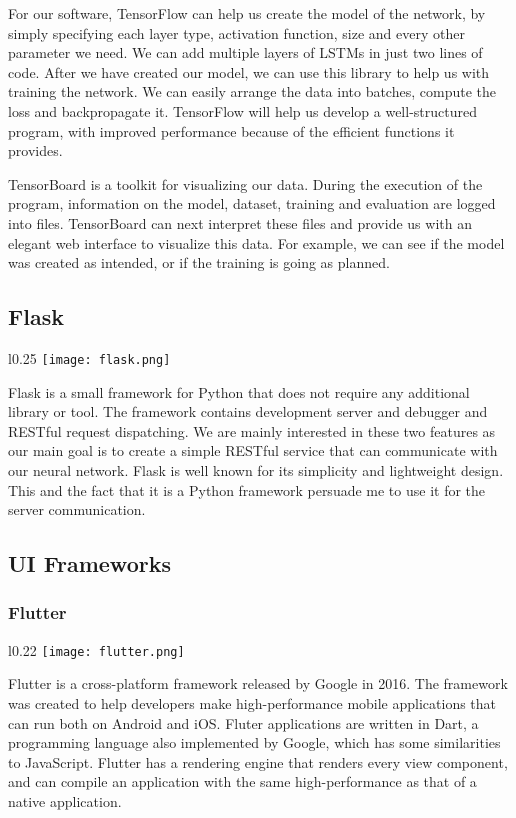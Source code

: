 \documentclass[../Thesis.tex]{subfiles}
\begin{document}
For our software, TensorFlow can help us create the model of the network, by simply specifying each layer type, activation function, size and every other parameter we need. We can add multiple layers of LSTMs in just two lines of code. After we have created our model, we can use this library to help us with training the network. We can easily arrange the data into batches, compute the loss and backpropagate it. TensorFlow will help us develop a well-structured program, with improved performance because of the efficient functions it provides.

TensorBoard is a toolkit for visualizing our data. During the execution of the program, information on the model, dataset, training and evaluation are logged into files. TensorBoard can next interpret these files and provide us with an elegant web interface to visualize this data.  For example, we can see if the model was created as intended, or if the training is going as planned.

\subsection {Flask}

\begin{wrapfigure}{l}{0.25\textwidth}
\label {fig: flask}
\texttt{[image: flask.png]}
\end{wrapfigure}
Flask is a small framework for Python that does not require any additional library or tool. The framework contains development server and debugger and RESTful request dispatching. We are mainly interested in these two features as our main goal is to create a simple RESTful service that can communicate with our neural network. Flask is well known for its simplicity and lightweight design. This and the fact that it is a Python framework persuade me to use it for the server communication.

\subsection {UI Frameworks}
\subsubsection {Flutter}

\begin{wrapfigure}{l}{0.22\textwidth}
\label {fig: flutter}
\texttt{[image: flutter.png]}
\end{wrapfigure}
Flutter is a cross-platform framework released by Google in 2016. The framework was created to help developers make high-performance mobile applications that can run both on Android and iOS. Fluter applications are written in Dart, a programming language also implemented by Google, which has some similarities to JavaScript. Flutter has a rendering engine that renders every view component, and can compile an application with the same high-performance as that of a native application.
\end{document}
